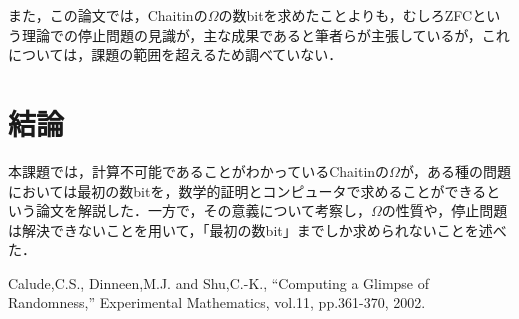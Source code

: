 \documentclass{jarticle}
\begin{document}
また，この論文では，Chaitinの$\Omega$の数bitを求めたことよりも，むしろZFCという理論での停止問題の見識が，主な成果であると筆者らが主張しているが，これについては，課題の範囲を超えるため調べていない．





\section{結論}
本課題では，計算不可能であることがわかっているChaitinの$\Omega$が，ある種の問題においては最初の数bitを，数学的証明とコンピュータで求めることができるという論文を解説した．一方で，その意義について考察し，$\Omega$の性質や，停止問題は解決できないことを用いて，「最初の数bit」までしか求められないことを述べた．



\begin{thebibliography}{n}

Calude,C.S., Dinneen,M.J. and Shu,C.-K., “Computing a Glimpse of Randomness,” Experimental Mathematics, vol.11, pp.361-370, 2002.

\end{thebibliography}
\end{document}
